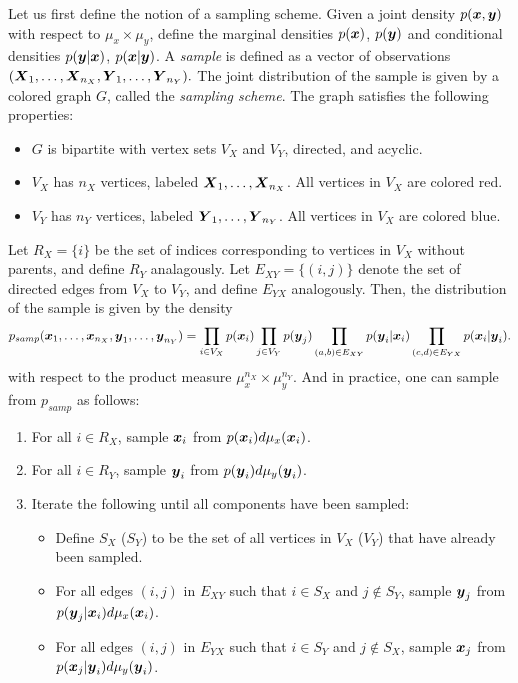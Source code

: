 \documentclass[12pt]{article}
\begin{document}
Let us first define the notion of a sampling scheme.  Given a joint
density $p(\boldsymbol{x}, \boldsymbol{y})$ with respect to $\mu_x \times \mu_y$, define the marginal densities $p(\boldsymbol{x})$,
$p(\boldsymbol{y})$ and conditional densities $p(\boldsymbol{y}|\boldsymbol{x})$, $p(\boldsymbol{x}|\boldsymbol{y})$.
A \emph{sample} is defined as a vector of observations
$(\boldsymbol{X}_1,\hdots, \boldsymbol{X}_{n_X}, \boldsymbol{Y}_1,\hdots, \boldsymbol{Y}_{n_Y}).$ The joint
distribution of the sample is given by a colored graph $G$,
called the \emph{sampling scheme}.  The graph satisfies the following properties:
\begin{itemize}
\item $G$ is bipartite with vertex sets $V_X$ and $V_Y$, directed, and acyclic.
\item $V_X$ has $n_X$ vertices, labeled $\boldsymbol{X}_1,\hdots, \boldsymbol{X}_{n_X}$.  All vertices in $V_X$ are colored red.
\item $V_Y$ has $n_Y$ vertices, labeled $\boldsymbol{Y}_1,\hdots, \boldsymbol{Y}_{n_Y}$.  All vertices in $V_X$ are colored blue.
\end{itemize}
Let $R_X = \{i\}$ be the set of indices corresponding to vertices in
$V_X$ without parents, and define $R_Y$ analagously.  Let $E_{XY}
= \{(i, j)\}$ denote the set of directed edges from $V_X$ to $V_Y$,
and define $E_{YX}$ analogously.  Then, the distribution of the sample
is given by the density
\[
p_{samp}(\boldsymbol{x}_1,\hdots, \boldsymbol{x}_{n_X}, \boldsymbol{y}_1,\hdots, \boldsymbol{y}_{n_Y}) 
= \prod_{i \in V_X} p(\boldsymbol{x}_i) \prod_{j \in V_Y} p(\boldsymbol{y}_j) \prod_{(a, b) \in E_{XY}} p(\boldsymbol{y}_i|\boldsymbol{x}_i) \prod_{(c,d) \in E_{YX}} p(\boldsymbol{x}_i|\boldsymbol{y}_i).
\]
with respect to the product measure $\mu_x^{n_X} \times \mu_y^{n_Y}.$
And in practice, one can sample from $p_{samp}$ as follows:
\begin{enumerate}
\item For all $i \in R_X$, sample $\boldsymbol{x}_i$ from $p(\boldsymbol{x}_i)d\mu_x(\boldsymbol{x}_i)$.
\item For all $i \in R_Y$, sample $\boldsymbol{y}_i$ from $p(\boldsymbol{y}_i)d\mu_y(\boldsymbol{y}_i)$.
\item Iterate the following until all components have been sampled:
\begin{itemize}
\item Define $S_X$ ($S_Y$) to be the set of all vertices in $V_X$ ($V_Y$) that have already been sampled.
\item For all edges $(i, j)$ in $E_{XY}$ such that $i \in S_X$ and $j \notin S_Y$, sample $\boldsymbol{y}_j$ from $p(\boldsymbol{y}_j|\boldsymbol{x}_i)d\mu_x(\boldsymbol{x}_i)$.
\item For all edges $(i, j)$ in $E_{YX}$ such that $i \in S_Y$ and $j \notin S_X$, sample $\boldsymbol{x}_j$ from $p(\boldsymbol{x}_j|\boldsymbol{y}_i)d\mu_y(\boldsymbol{y}_i)$.
\end{itemize}
\end{enumerate}
\end{document}
